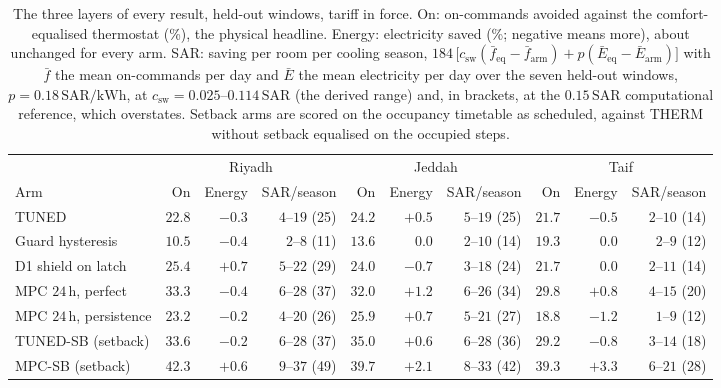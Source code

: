 \documentclass[pdflatex,sn-mathphys-num,iicol]{sn-jnl}
\theoremstyle{thmstyleone}\newtheorem{proposition}{Proposition}\newtheorem{corollary}{Corollary}
\theoremstyle{thmstyletwo}\newtheorem{remark}{Remark}\newtheorem{observation}{Observation}
\theoremstyle{thmstylethree}\newtheorem{definition}{Definition}
\newcommand{\csw}{c_{\mathrm{sw}}}
\newcommand{\SAR}{\text{SAR}}
\newcommand{\kWh}{\text{kWh}}
\begin{document}
\begin{table}[t]
\centering
\caption{The three layers of every result, held-out windows, tariff in force.
On: on-commands avoided against the comfort-equalised thermostat (\%), the
physical headline. Energy: electricity saved (\%; negative means more), about
unchanged for every arm. SAR: saving per room per cooling season,
$184\,\bigl[\csw(\bar f_{\mathrm{eq}}-\bar f_{\mathrm{arm}})+p(\bar E_{\mathrm{eq}}-\bar E_{\mathrm{arm}})\bigr]$
with $\bar f$ the mean on-commands per day and $\bar E$ the mean electricity per
day over the seven held-out windows, $p=0.18\,\SAR/\kWh$, at
$\csw=0.025$--$0.114\,\SAR$ (the derived range) and, in brackets, at the
$0.15\,\SAR$ computational reference, which overstates. Setback arms are
scored on the occupancy timetable as scheduled, against THERM without setback
equalised on the occupied steps.}
\label{tab:layers}
\setlength{\tabcolsep}{2pt}
\footnotesize
\begin{tabular*}{\textwidth}{@{\extracolsep{\fill}}lrrrrrrrrr@{}}
\toprule
 & \multicolumn{3}{c}{Riyadh} & \multicolumn{3}{c}{Jeddah} & \multicolumn{3}{c}{Taif} \\
\cmidrule(lr){2-4}\cmidrule(lr){5-7}\cmidrule(lr){8-10}
Arm & On & Energy & SAR/season & On & Energy & SAR/season & On & Energy & SAR/season \\
\midrule
TUNED & $22.8$ & $-0.3$ & $4$--$19$ (25) & $24.2$ & $+0.5$ & $5$--$19$ (25) & $21.7$ & $-0.5$ & $2$--$10$ (14) \\
Guard hysteresis & $10.5$ & $-0.4$ & $2$--$8$ (11) & $13.6$ & $0.0$ & $2$--$10$ (14) & $19.3$ & $0.0$ & $2$--$9$ (12) \\
D1 shield on latch & $25.4$ & $+0.7$ & $5$--$22$ (29) & $24.0$ & $-0.7$ & $3$--$18$ (24) & $21.7$ & $0.0$ & $2$--$11$ (14) \\
MPC $24\,$h, perfect & $33.3$ & $-0.4$ & $6$--$28$ (37) & $32.0$ & $+1.2$ & $6$--$26$ (34) & $29.8$ & $+0.8$ & $4$--$15$ (20) \\
MPC $24\,$h, persistence & $23.2$ & $-0.2$ & $4$--$20$ (26) & $25.9$ & $+0.7$ & $5$--$21$ (27) & $18.8$ & $-1.2$ & $1$--$9$ (12) \\
TUNED-SB (setback) & $33.6$ & $-0.2$ & $6$--$28$ (37) & $35.0$ & $+0.6$ & $6$--$28$ (36) & $29.2$ & $-0.8$ & $3$--$14$ (18) \\
MPC-SB (setback) & $42.3$ & $+0.6$ & $9$--$37$ (49) & $39.7$ & $+2.1$ & $8$--$33$ (42) & $39.3$ & $+3.3$ & $6$--$21$ (28) \\
\bottomrule
\end{tabular*}
\end{table}
\end{document}
